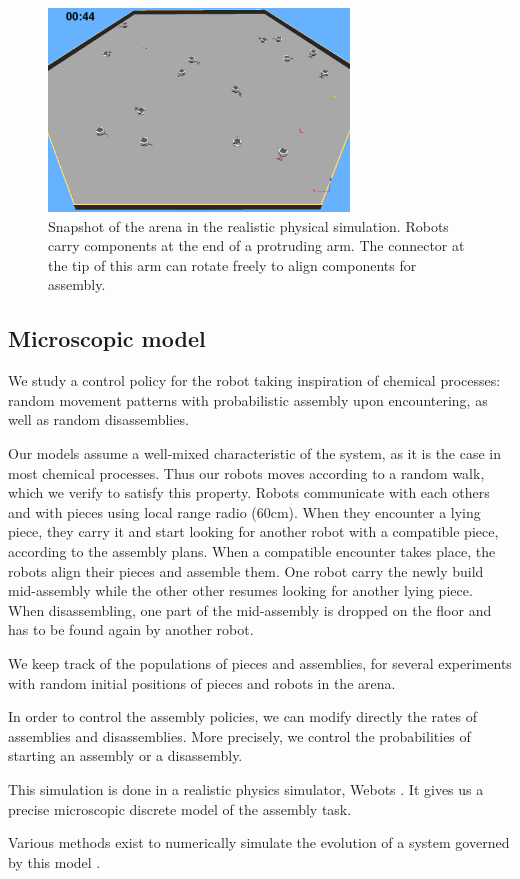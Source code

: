     \begin{figure}[h]
        \centering
            \includegraphics[width=8cm]{img/overall_arena_3.png}
        \caption{Snapshot of the arena in the realistic physical simulation.
Robots carry components at the end of a protruding arm. The
connector at the tip of this arm can rotate freely to align
components for assembly.}
        \label{fig:overall_arena}
    \end{figure}


\subsection{Microscopic model} %
\label{sub:stochastic_assembly}
    We study a control policy for the robot taking inspiration of chemical processes:
    random movement patterns with probabilistic assembly upon encountering, as well as
    random disassemblies.

    Our models assume a well-mixed characteristic of the system, as it is the case in
    most chemical processes. Thus our robots moves according to a random walk, which we
    verify to satisfy this property.
    Robots communicate with each others and with pieces using local range radio (60cm).
    When they encounter a lying piece, they carry it and start looking for another robot
    with a compatible piece, according to the assembly plans. When a compatible encounter
    takes place, the robots align their pieces and assemble them. One robot carry the newly
    build mid-assembly while the other other resumes looking for another lying piece. When
    disassembling, one part of the mid-assembly is dropped on the floor and has to be found
     again by another robot.

    We keep track of the populations of pieces and assemblies, for several experiments with
    random initial positions of pieces and robots in the arena.

    In order to control the assembly policies, we can modify directly the rates of assemblies
     and disassemblies. More precisely, we control the probabilities of starting an assembly
     or a disassembly.

    This simulation is done in a realistic physics simulator, Webots \cite{Michel:2004p10762}.
     It gives us a precise microscopic discrete model of the assembly task.

Various methods exist to numerically simulate the evolution of a
system governed by this model
\cite{Gillespie:2007p1788,Puchalka:2004p4312}.

